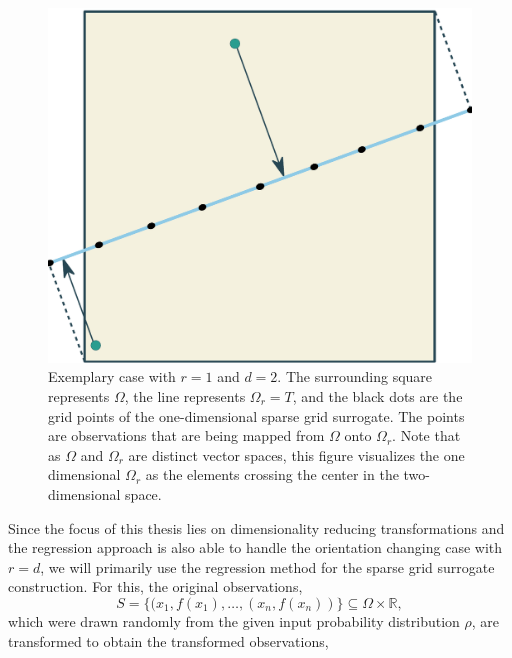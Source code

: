 \documentclass[
  a4paper,  %
  twoside,  %
  bibliography=totoc,
  headsepline,
  cleardoublepage=empty,
  parskip=half,
  draft=false
]{scrbook}
\begin{document}
\begin{mdframed}[style=style]
\begin{figure}[H]
        \centering
\begin{minipage}{.5\textwidth}
        \centering
  \caption{Exemplary case with $r=1$ and $d=2$.
  The surrounding \beige square represents $\Omega$, the \lightblue line represents $\Omega_r=T$, and the black dots are the grid points of the one-dimensional sparse grid surrogate.
The \green points are observations that are being mapped from $\Omega$ onto $\Omega_r$.
Note that as $\Omega$ and $\Omega_r$ are distinct vector spaces, this figure visualizes the one dimensional $\Omega_r$ as the elements crossing the center in the two-dimensional space.}
\label{fig:reduced_grid}
    \end{minipage}%
    \begin{minipage}{0.5\textwidth}
        \centering
   \includegraphics[width=0.85\linewidth]{graphics/reduced_grid}
    \end{minipage}
\end{figure}
\end{mdframed}
%
Since the focus of this thesis lies on dimensionality reducing transformations and the regression approach is also able to handle the orientation changing case with $r=d$, we will primarily use the regression method for the sparse grid surrogate construction.
For this, the original observations,
\begin{equation}
S =\{(x_1, f(x_1), \dots, (x_n, f(x_n))\} \subseteq \Omega \times \mathds{R},
\end{equation}
which were drawn randomly from the given input probability distribution $\rho$, are transformed to obtain the transformed observations,
\end{document}
